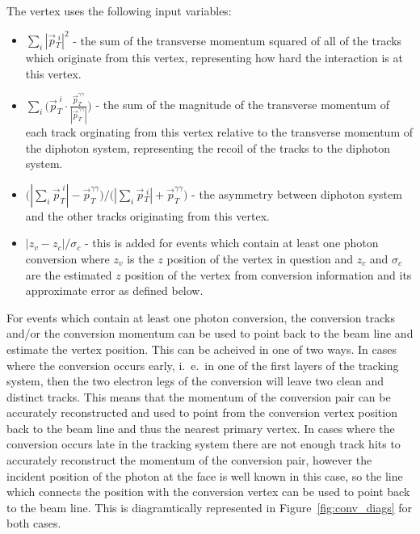 The vertex \BDT uses the following input variables:

\begin{itemize}
  \item $\sum\limits_{i} |\vec{p}{}^{\;i}_{T}|^{2}$ - the sum of the transverse momentum squared of all of the tracks which originate from this vertex, representing how hard the interaction is at this vertex.
  \item $\sum\limits_{i} \bigl(\vec{p}^{\;i}_{T} \cdot \frac{\vec{p}^{\gamma\gamma}_{T}}{|\vec{p}^{\gamma\gamma}_{T}|}\bigr)$ - the sum of the magnitude of the transverse momentum of each track orginating from this vertex relative to the transverse momentum of the diphoton system, representing the recoil of the tracks to the diphoton system.
  \item $\bigr(|\sum\limits_{i} \vec{p}^{\;i}_{T}| - \vec{p}^{\gamma\gamma}_{T}\bigl) / \bigr(|\sum\limits_{i} \vec{p}{}^{\;i}_{T}| + \vec{p}^{\gamma\gamma}_{T}\bigl)$ - the asymmetry between diphoton system and the other tracks originating from this vertex.
  \item $|z_{v}-z_{c}|/\sigma_{c}$ - this is added for events which contain at least one photon conversion where $z_{v}$ is the $z$ position of the vertex in question and $z_{c}$ and $\sigma_{c}$ are the estimated $z$ position of the vertex from conversion information and its approximate error as defined below.
\end{itemize}

For events which contain at least one photon conversion, the conversion tracks and/or the conversion momentum can be used to point back to the beam line and estimate the vertex position. This can be acheived in one of two ways. In cases where the conversion occurs early, i.~e.~in one of the first layers of the tracking system, then the two electron legs of the conversion will leave two clean and distinct tracks. This means that the momentum of the conversion pair can be accurately reconstructed and used to point from the conversion vertex position back to the beam line and thus the nearest primary vertex. In cases where the conversion occurs late in the tracking system there are not enough track hits to accurately reconstruct the momentum of the conversion pair, however the incident position of the photon at the \ECAL face is well known in this case, so the line which connects the \ECAL position with the conversion vertex can be used to point back to the beam line. This is diagramtically represented in Figure~\ref{fig:conv_diags} for both cases.


